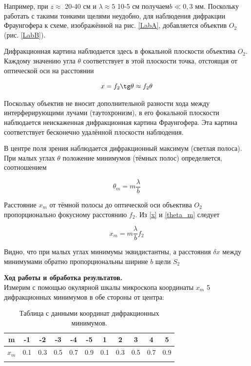 \documentclass[a4paper, 12pt]{article}%
\begin{document}
	Например, при $ z \approx $ 20-40 см и $  \lambda \approx 5  $ 10-5  см получаем$  b \ll 0,3 $ мм. Поскольку работать с такими тонкими щелями неудобно, для наблюдения дифракции Фраунгофера к схеме, изображённой на рис. \ref{LabA}, добавляется объектив $ O_2  $ (рис. \ref{LabB}).
	
	Дифракционная картина наблюдается здесь в фокальной плоскости
	объектива $ O_2 $. Каждому значению угла $ \theta $ соответствует в этой плоскости точка, отстоящая от оптической оси на расстоянии
	
	\begin{equation}\label{x}
		x = f_2 \tg \theta \approx f_2 \theta
	\end{equation}
	
	Поскольку объектив не вносит дополнительной разности хода
	между интерферирующими лучами (таутохронизм), в его фокальной
	плоскости наблюдается неискаженная дифракционная картина Фраунгофера. Эта картина соответствует бесконечно удалённой плоскости
	наблюдения.
	
	В центре поля зрения наблюдается дифракционный максимум (светлая полоса). При малых углах $ \theta $ положение минимумов (тёмных полос)
	определяется, соотношением
	
	\begin{equation}\label{theta_m}
		\theta_m = m \dfrac{\lambda}{b}
	\end{equation}
	
	Расстояние $ x_m $ от тёмной полосы до оптической оси объектива $ O_2 $ пропорционально фокусному расстоянию $ f_2 $. Из \eqref{x} и \eqref{theta_m} следует 
	
	\begin{equation}\label{xm}
		x_m = m \dfrac{\lambda}{b} f_2
	\end{equation}
	
	Видно, что при малых углах минимумы эквидистантны, а расстояния $ \delta x $ между минимумами обратно пропорциональны ширине $ b $ щели $ S_2 $
	
	\textbf{Ход работы и обработка результатов.}\\
	
	Измерим с помощью окулярной шкалы микроскопа координаты $x_m$ 5 дифракционных минимумов в обе стороны
	от центра:
	
		\begin{longtable}{|c|c|c|c|c|c|c|c|c|c|c|}
		\hline
		m& -1&  -2 & -3& -4 & -5 & 1&  2 & 3& 4 & 5  \\ \hline
		$x_m$&0.1& 0.3 & 0.5& 0.7 & 0.9& 0.1& 0.3 & 0.5& 0.7 & 0.9\\ \hline
		\caption{Таблица с данными координат дифракционных минимумов.}
	\end{longtable}
\end{document}
